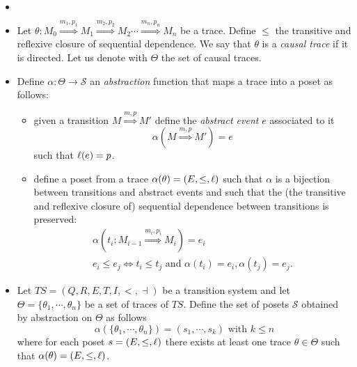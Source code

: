 \begin{definition}
  \label{def:abstraction}
  \begin{itemize}
  \item[] $~$
  \item Let $\theta:M_0\overset{m_1,p_1}{\Rightarrow} M_1\overset{m_2,p_2}{\Rightarrow} M_2 \cdots \overset{m_n,p_n}{\Rightarrow} M_n$ be a trace. Define $\leq$ the transitive and reflexive closure of sequential dependence. We say that $\theta$ is a \emph{causal trace} if it is directed.
    Let us denote with $\Theta$ the set of causal traces.
  \item Define $\alpha:\Theta\to\mathcal{S}$ an \emph{abstraction} function that maps a trace into a poset as follows:
    \begin{itemize}
    \item given a transition $M\overset{m,p}{\Rightarrow} M'$ define the \emph{abstract event} $e$ associated to it
      \[
      \alpha(M\overset{m,p}{\Rightarrow} M') = e
      \]
      such that $\ell(e) = p$.
    \item define a poset from a trace $\alpha(\theta) = (E,\leq,\ell)$ such that $\alpha$ is a bijection between transitions and abstract events and such that the (the transitive and reflexive closure of) sequential dependence between transitions is preserved:
      \begin{align*}
        \alpha(t_i:M_{i-1}\overset{m_{i},p_{i}}{\Rightarrow}M_i) = e_i \\
        e_i \leq e_j \iff t_i \leq t_j \text{ and } \alpha(t_i)=e_i, \alpha(t_j)=e_j.
      \end{align*}
    \end{itemize}
  \item
    Let $TS = (Q,R,E,T,I,<,\dashv)$ be a transition system and let $\Theta = \{\theta_1,\cdots,\theta_n\}$ be a set of traces of $TS$.
    Define the set of posets $\mathcal{S}$ obtained by abstraction on $\Theta$ as follows
    \[
    \alpha(\{\theta_1,\cdots,\theta_n\}) = (s_1,\cdots, s_k)\text{ with }k\leq n
    \]
    where for each poset $s = (E,\leq,\ell)$ there exists at least one trace $\theta\in\Theta$ such that $\alpha(\theta) = (E,\leq,\ell)$.
  \end{itemize}
\end{definition}

